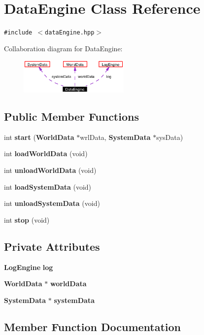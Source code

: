 \section{Data\-Engine Class Reference}
\label{classDataEngine}
{\tt \#include $<$data\-Engine.hpp$>$}

Collaboration diagram for Data\-Engine:\begin{figure}[H]
\begin{center}
\leavevmode
\includegraphics[width=152pt]{classDataEngine__coll__graph}
\end{center}
\end{figure}
\subsection*{Public Member Functions}
\begin{CompactItemize}
\item 
int {\bf start} ({\bf World\-Data} $\ast$wrl\-Data, {\bf System\-Data} $\ast$sys\-Data)
\item 
int {\bf load\-World\-Data} (void)
\item 
int {\bf unload\-World\-Data} (void)
\item 
int {\bf load\-System\-Data} (void)
\item 
int {\bf unload\-System\-Data} (void)
\item 
int {\bf stop} (void)
\end{CompactItemize}
\subsection*{Private Attributes}
\begin{CompactItemize}
\item 
{\bf Log\-Engine} {\bf log}
\item 
{\bf World\-Data} $\ast$ {\bf world\-Data}
\item 
{\bf System\-Data} $\ast$ {\bf system\-Data}
\end{CompactItemize}


\subsection{Member Function Documentation}
